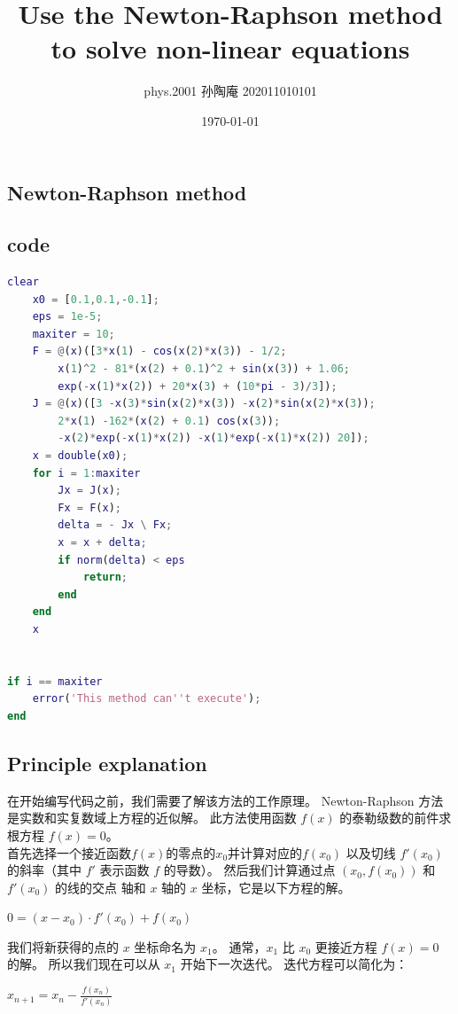 \documentclass[12pt, a4paper, oneside]{ctexart}
\title{Use the Newton-Raphson method to solve non-linear equations}
\date{\today}
\author{phys.2001 孙陶庵 202011010101 }
\begin{document}
\begin{spacing}{2.0}
\tableofcontents
\maketitle
\section{Newton-Raphson method}
\subsection{code}
\begin{lstlisting}[language=Matlab, caption=Newton-Raphson method]
    clear
    x0 = [0.1,0.1,-0.1];
    eps = 1e-5;
    maxiter = 10;
    F = @(x)([3*x(1) - cos(x(2)*x(3)) - 1/2;
        x(1)^2 - 81*(x(2) + 0.1)^2 + sin(x(3)) + 1.06;
        exp(-x(1)*x(2)) + 20*x(3) + (10*pi - 3)/3]);
    J = @(x)([3 -x(3)*sin(x(2)*x(3)) -x(2)*sin(x(2)*x(3)); 
        2*x(1) -162*(x(2) + 0.1) cos(x(3));
        -x(2)*exp(-x(1)*x(2)) -x(1)*exp(-x(1)*x(2)) 20]);
    x = double(x0);
    for i = 1:maxiter
        Jx = J(x);
        Fx = F(x);
        delta = - Jx \ Fx;
        x = x + delta;
        if norm(delta) < eps
            return;
        end
    end
    x


if i == maxiter
    error('This method can''t execute');
end

    \end{lstlisting}
\subsection{Principle explanation\cite{key2}\cite{key3}}
在开始编写代码之前，我们需要了解该方法的工作原理。 Newton-Raphson 方法是实数和实复数域上方程的近似解。 此方法使用函数 $f(x)$ 的泰勒级数的前件求根方程 $f(x)=0$。 \\
首先选择一个接近函数$f(x)$的零点的$x_0$并计算对应的$f(x_0)$
以及切线 $f'(x_0)$ 的斜率（其中 $f'$ 表示函数 $f$ 的导数）。
然后我们计算通过点 $(x_0, f(x_0))$ 和 $f'(x_0)$ 的线的交点
轴和 $x$ 轴的 $x$ 坐标，它是以下方程的解。
\begin{center}
    $0= (x-x_0)\cdot f'(x_0)+f(x_0)$
\end{center}

我们将新获得的点的 $x$ 坐标命名为 $x_1$。
通常，$x_1$ 比 $x_0$ 更接近方程 $f(x)=0$ 的解。
所以我们现在可以从 $x_1$ 开始下一次迭代。 迭代方程可以简化为：
\begin{center}
    $x_{n+1} = x_n - \frac{f(x_n)}{f'(x_n)}$
\end{center}


\end{spacing}
\end{document}
